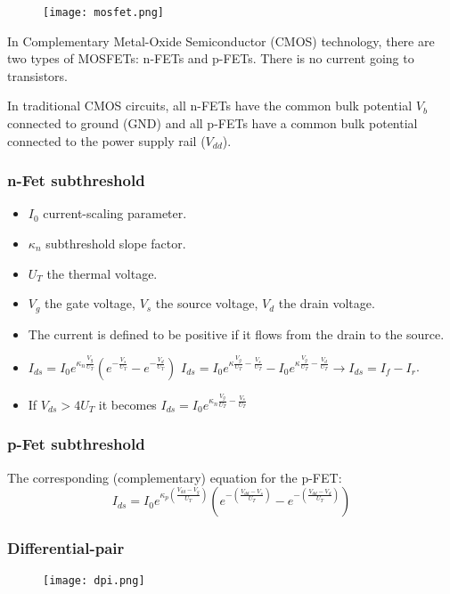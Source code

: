 \documentclass[main]{subfiles}
\begin{document}
\begin{figure}[H]
	\centering
	\texttt{[image: mosfet.png]}
\end{figure}

In Complementary Metal-Oxide Semiconductor (CMOS) technology, there are two types of MOSFETs: n-FETs and p-FETs. There is no current going to transistors.

In traditional CMOS circuits, all n-FETs have the common bulk potential $V_b$ connected to ground (GND) and all p-FETs have a common bulk potential connected to the power supply rail ($V_{dd}$).

\subsubsection{n-Fet subthreshold}
\begin{itemize}[noitemsep,nolistsep]
	\item $I_0$ current-scaling parameter.
	\item $\kappa_n$ subthreshold slope factor.
	\item $U_T$ the thermal voltage.
	\item $V_g$ the gate voltage, $V_s$ the source voltage, $V_d$ the drain voltage.
	\item The current is defined to be positive if it flows from the drain to the source.
	\item $I_{ds} = I_0e^{\kappa_n\frac{V_g}{U_T}}(e^{-\frac{V_s}{U_T}}-e^{-\frac{V_d}{U_T}})$
	\subitem $I_{ds} = I_0 e^{\kappa \frac{V_g}{U_T} - \frac{V_s}{U_T}} - I_0 e^{\kappa \frac{V_g}{U_T} - \frac{V_d}{U_T}} \rightarrow I_{ds} = I_f - I_r$.
	\item If $V_{ds} > 4U_T$ it becomes $I_{ds} = I_0e^{\kappa_n \frac{V_g}{U_T}-\frac{V_s}{U_T}}$
\end{itemize}

\subsubsection{p-Fet subthreshold}
The corresponding (complementary) equation for the p-FET:
\[ I_{ds}=I_0e^{\kappa_p(\frac{V_{dd}-V_g}{U_T})}(e^{-(\frac{V_{dd}-V_s}{U_T})}-e^{-(\frac{V_{dd}-V_d}{U_T})}) \]

\subsubsection{Differential-pair}
\begin{figure}[H]
	\centering
	\texttt{[image: dpi.png]}
\end{figure}
\end{document}
